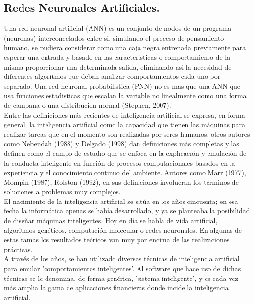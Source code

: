 \subsection{Redes Neuronales Artificiales.}

Una red neuronal artificial (ANN) es un conjunto de nodos de un programa (neuronas) interconectados entre si, simulando el proceso de pensamiento humano, se pudiera considerar como una caja negra entrenada previamente para esperar una entrada y basado en las caracteristicas o comportamiento de la misma proporcionar una determinada salida, eliminando asi la necesidad de diferentes algoritmos que deban analizar comportamientos cada uno por separado. Una red neuronal probabilistica (PNN) no es mas que una ANN que usa funciones estadisticas que escalan la variable no linealmente como una forma de campana o una distribucion normal (Stephen, 2007).\\

Entre las definiciones más recientes de inteligencia artificial se expresa, en forma general, la inteligencia artificial como la capacidad que tienen las máquinas para realizar tareas que en el momento son realizadas por seres humanos; otros autores como Nebendah (1988) y Delgado (1998) dan definiciones más completas y las definen como el campo de estudio que se enfoca en la explicación y emulación de la conducta inteligente en función de procesos computacionales basados en la experiencia y el conocimiento continuo del ambiente. Autores como Marr (1977), Mompin (1987), Rolston (1992), en sus definiciones involucran los términos de soluciones a problemas muy complejos.\\

El nacimiento de la inteligencia artificial se sitúa en los años cincuenta; en esa fecha la informática apenas se había desarrollado, y ya se planteaba la posibilidad de diseñar máquinas inteligentes. Hoy en día se habla de vida artificial, algoritmos genéticos, computación molecular o redes neuronales. En algunas de estas ramas los resultados teóricos van muy por encima de las realizaciones prácticas.\\

A través de los años, se han utilizado diversas técnicas de inteligencia artificial para emular 'comportamientos inteligentes'. Al software que hace uso de dichas técnicas se le denomina, de forma genérica, 'sistema inteligente', y es cada vez más amplia la gama de aplicaciones financieras donde incide la inteligencia artificial.\\

